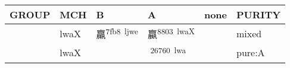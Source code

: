 \documentclass[14pt,a4paper]{scrartcl}
\begin{document}
\begin{longtable}[c]{@{}llllll@{}}
\toprule
\begin{minipage}[b]{0.14\columnwidth}\raggedright\strut
GROUP
\strut\end{minipage} &
\begin{minipage}[b]{0.14\columnwidth}\raggedright\strut
MCH
\strut\end{minipage} &
\begin{minipage}[b]{0.14\columnwidth}\raggedright\strut
B
\strut\end{minipage} &
\begin{minipage}[b]{0.14\columnwidth}\raggedright\strut
A
\strut\end{minipage} &
\begin{minipage}[b]{0.14\columnwidth}\raggedright\strut
none
\strut\end{minipage} &
\begin{minipage}[b]{0.14\columnwidth}\raggedright\strut
PURITY
\strut\end{minipage}\tabularnewline
\midrule
\endhead
\begin{minipage}[t]{0.14\columnwidth}\raggedright\strut
𣎆
\strut\end{minipage} &
\begin{minipage}[t]{0.14\columnwidth}\raggedright\strut
lwaX
\strut\end{minipage} &
\begin{minipage}[t]{0.14\columnwidth}\raggedright\strut
羸\textsuperscript{7fb8~ljwe}
\strut\end{minipage} &
\begin{minipage}[t]{0.14\columnwidth}\raggedright\strut
蠃\textsuperscript{8803~lwaX}
\strut\end{minipage} &
\begin{minipage}[t]{0.14\columnwidth}\raggedright\strut
\strut\end{minipage} &
\begin{minipage}[t]{0.14\columnwidth}\raggedright\strut
mixed
\strut\end{minipage}\tabularnewline
\begin{minipage}[t]{0.14\columnwidth}\raggedright\strut
𦟀
\strut\end{minipage} &
\begin{minipage}[t]{0.14\columnwidth}\raggedright\strut
lwaX
\strut\end{minipage} &
\begin{minipage}[t]{0.14\columnwidth}\raggedright\strut
\strut\end{minipage} &
\begin{minipage}[t]{0.14\columnwidth}\raggedright\strut
𦝠\textsuperscript{26760~lwa}
\strut\end{minipage} &
\begin{minipage}[t]{0.14\columnwidth}\raggedright\strut
\strut\end{minipage} &
\begin{minipage}[t]{0.14\columnwidth}\raggedright\strut
pure:A
\strut\end{minipage}\tabularnewline
\bottomrule
\end{longtable}
\end{document}
